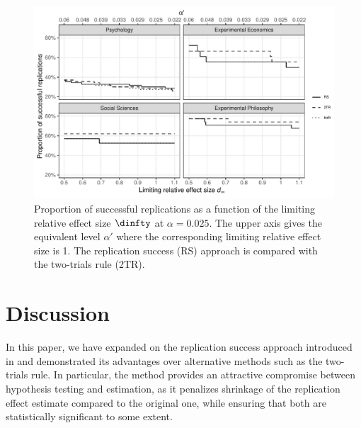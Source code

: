 \begin{figure}[!htb]
\begin{knitrout}
\color{fgcolor}

{\centering \includegraphics[width=\maxwidth]{images/paper1/fig7-1}

}

\end{knitrout}
\caption{Proportion of successful replications as a function of the limiting
  relative effect size $\dinfty$ at $\alpha = 0.025$. The upper axis gives the
  equivalent level $\alpha'$ where the corresponding limiting relative effect
  size is 1. The replication success (RS) approach is compared with the
  two-trials rule (2TR).}
\label{fig1:fig7}
\end{figure}



\section{Discussion}\label{sec1:discussion}
In this paper, we have expanded on the replication success approach introduced
in \citet{Held2020} and demonstrated its advantages over alternative methods
such as the two-trials rule. In particular, the method provides an attractive
compromise between hypothesis testing and estimation,
as it penalizes
shrinkage of the replication effect estimate compared to the original one,
while ensuring that both are statistically significant to some extent.

